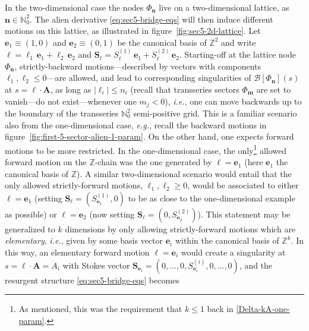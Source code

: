 \documentclass[11pt,a4paper]{article}
\def\BN{{\mathbb N}}
\def\BZ{{\mathbb Z}}
\begin{document}
In the two-dimensional case the nodes $\Phi_{\boldsymbol{n}}$ live on a two-dimensional lattice, as $\boldsymbol{n} \in \BN^2_0$. The alien derivative \eqref{eq:sec5-bridge-eqs} will then induce different motions on this lattice, as illustrated in figure~\ref{fig:sec5-2d-lattice}. Let $\boldsymbol{e}_1 \equiv (1,0)$ and $\boldsymbol{e}_2 \equiv (0,1)$ be the canonical basis of $\BZ^2$ and write $\boldsymbol{\ell} = \ell_{1}\, \boldsymbol{e}_1 + \ell_{2}\, \boldsymbol{e}_2$ and $\boldsymbol{S}_{\boldsymbol{\ell}} = S_{\boldsymbol{\ell}}^{(1)}\, \boldsymbol{e}_1 + S_{\boldsymbol{\ell}}^{(2)}\, \boldsymbol{e}_2$. Starting-off at the lattice node $\Phi_{\boldsymbol{n}}$, strictly-backward motions---described by vectors with components $\ell_{1}, \ell_{2} \le 0$---are allowed, and lead to corresponding singularities of $\mathcal{B} [\Phi_{\boldsymbol{n}}] (s)$ at $s=\boldsymbol{\ell}\cdot\boldsymbol{A}$, as long as $\left|\ell_{i}\right| \leq n_{i}$ (recall that transseries sectors $\Phi_{\boldsymbol{m}}$ are set to vanish---do not exist---whenever one $m_j<0$), \textit{i.e.}, one can move backwards up to the boundary of the transseries $\BN^2_0$ semi-positive grid. This is a familiar scenario also from the one-dimensional case, \textit{e.g.}, recall the backward motions in figure~\ref{fig:first-5-sector-alien-1-param}. On the other hand, one expects forward motions to be more restricted. In the one-dimensional case, the only\footnote{As mentioned, this was the requirement that $k \leq 1$ back in \eqref{Delta-kA-one-param}.} allowed forward motion on the $\BZ$-chain was the one generated by $\boldsymbol{\ell} = \boldsymbol{e}_1$ (here $\boldsymbol{e}_1$ the canonical basis of $\BZ$). A similar two-dimensional scenario would entail that the only allowed strictly-forward motions, $\ell_{1}, \ell_{2} \ge 0$, would be associated to either $\boldsymbol{\ell} = \boldsymbol{e}_1$ (setting $\boldsymbol{S}_{\boldsymbol{\ell}} = ( S_{\boldsymbol{e}_1}^{(1)}, 0 )$ to be as close to the one-dimensional example as possible) or $\boldsymbol{\ell} = \boldsymbol{e}_2$ (now setting $\boldsymbol{S}_{\boldsymbol{\ell}} = ( 0, S_{\boldsymbol{e}_2}^{(2)} )$). This statement may be generalized to $k$ dimensions by only allowing strictly-forward motions which are \textit{elementary}, \textit{i.e.}, given by some basis vector $\boldsymbol{e}_i$ within the canonical basis of $\BZ^k$. In this way, an elementary forward motion $\boldsymbol{\ell} = \boldsymbol{e}_i$ would create a singularity at $s = \boldsymbol{\ell}\cdot \boldsymbol{A} = A_i$ with Stokes vector $\boldsymbol{S}_{\boldsymbol{e}_i} = ( 0, \ldots, 0, S_{\boldsymbol{e}_i}^{(i)}, 0, \ldots, 0 )$, and the resurgent structure \eqref{eq:sec5-bridge-eqs} becomes 
\end{document}
